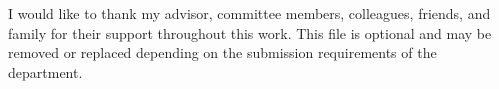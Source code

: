 I would like to thank my advisor, committee members, colleagues, friends, and family for their support throughout this work. This file is optional and may be removed or replaced depending on the submission requirements of the department.

